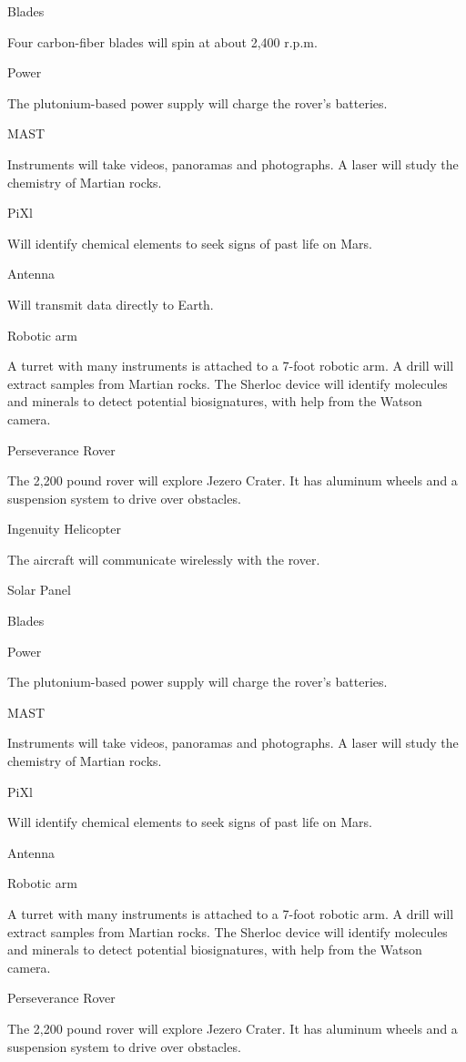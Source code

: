 Blades

Four carbon-fiber blades will spin at about 2,400 r.p.m.

Power

The plutonium-based power supply will charge the rover's batteries.

MAST

Instruments will take videos, panoramas and photographs. A laser will
study the chemistry of Martian rocks.

PiXl

Will identify chemical elements to seek signs of past life on Mars.

Antenna

Will transmit data directly to Earth.

Robotic arm

A turret with many instruments is attached to a 7-foot robotic arm. A
drill will extract samples from Martian rocks. The Sherloc device will
identify molecules and minerals to detect potential biosignatures, with
help from the Watson camera.

Perseverance Rover

The 2,200 pound rover will explore Jezero Crater. It has aluminum wheels
and a suspension system to drive over obstacles.

Ingenuity Helicopter

The aircraft will communicate wirelessly with the rover.

Solar Panel

Blades

Power

The plutonium-based power supply will charge the rover's batteries.

MAST

Instruments will take videos, panoramas and photographs. A laser will
study the chemistry of Martian rocks.

PiXl

Will identify chemical elements to seek signs of past life on Mars.

Antenna

Robotic arm

A turret with many instruments is attached to a 7-foot robotic arm. A
drill will extract samples from Martian rocks. The Sherloc device will
identify molecules and minerals to detect potential biosignatures, with
help from the Watson camera.

Perseverance Rover

The 2,200 pound rover will explore Jezero Crater. It has aluminum wheels
and a suspension system to drive over obstacles.

